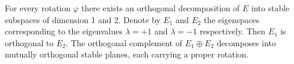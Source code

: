 For every rotation $\varphi$ there exists an orthogonal decomposition of $E$ into stable subspaces of dimension 1 and 2. Denote by $E_1$ and $E_2$ the eigenspaces corresponding to the eigenvalues $\lambda = +1$ and $\lambda = -1$ respectively. Then $E_1$ is orthogonal to $E_2$. The orthogonal complement of $E_1 \oplus E_2$ decomposes into mutually orthogonal stable planes, each carrying a proper rotation.
